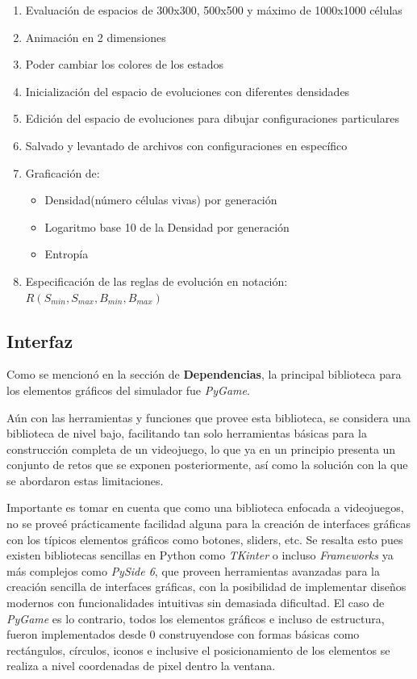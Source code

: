 \documentclass[]{article}
\begin{document}
		\begin{enumerate}
			\item Evaluación de espacios de 300x300, 500x500 y máximo de 1000x1000 células
			\item Animación en 2 dimensiones
			\item Poder cambiar los colores de los estados
			\item Inicialización del espacio de evoluciones con diferentes densidades
			\item Edición del espacio de evoluciones para dibujar configuraciones particulares
			\item Salvado y levantado de archivos con configuraciones en específico
			\item Graficación de:
				\begin{itemize}
					\item Densidad(número células vivas) por generación
					\item Logaritmo base 10 de la Densidad por generación
					\item Entropía
				\end{itemize}
			\item Especificación de las reglas de evolución en notación: $R(S_{min},S_{max},B_{min},B_{max})$
		\end{enumerate}
	
	\newpage
	\subsection{Interfaz}
		Como se mencionó en la sección de \textbf{Dependencias}, la principal biblioteca para los elementos gráficos del simulador fue \textit{PyGame}.
		
		Aún con las herramientas y funciones que provee esta biblioteca, se considera una biblioteca de nivel bajo, facilitando tan solo herramientas básicas para la construcción completa de un videojuego, lo que ya en un principio presenta un conjunto de retos que se exponen posteriormente, así como la solución con la que se abordaron estas limitaciones.
		
		Importante es tomar en cuenta que como una biblioteca enfocada a videojuegos, no se proveé prácticamente facilidad alguna para la creación de interfaces gráficas con los típicos elementos gráficos como botones, sliders, etc. Se resalta esto pues existen bibliotecas sencillas en Python como \textit{TKinter} o incluso \textit{Frameworks} ya más complejos como \textit{PySide 6}, que proveen herramientas avanzadas para la creación sencilla de interfaces gráficas, con la posibilidad de implementar diseños modernos con funcionalidades intuitivas sin demasiada dificultad. El caso de \textit{PyGame} es lo contrario, todos los elementos gráficos e incluso de estructura, fueron implementados desde 0 construyendose con formas básicas como rectángulos, círculos, iconos e inclusive el posicionamiento de los elementos se realiza a nivel coordenadas de pixel dentro la ventana.
		
\end{document}
